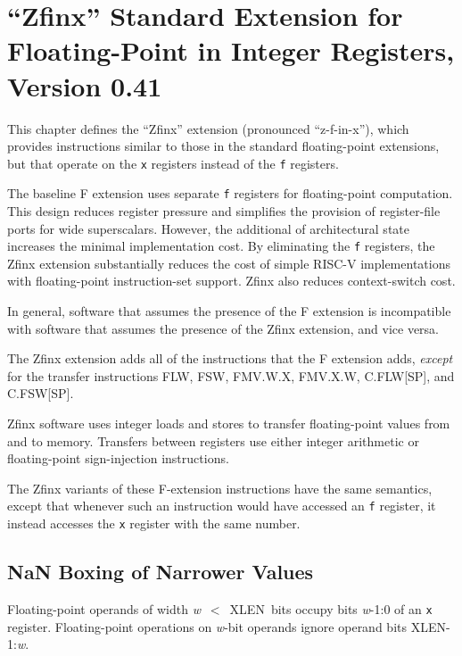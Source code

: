 \chapter{``Zfinx'' Standard Extension for Floating-Point in Integer Registers, Version 0.41}
\label{sec:zfinx}

This chapter defines the ``Zfinx'' extension (pronounced ``z-f-in-x''), which
provides instructions similar to those in the standard floating-point
extensions, but that operate on the {\tt x} registers instead of the {\tt f}
registers.

\begin{commentary}
The baseline F extension uses separate {\tt f} registers for floating-point
computation.
This design reduces register pressure and simplifies the provision of
register-file ports for wide superscalars.
However, the additional  of architectural state increases the
minimal implementation cost.
By eliminating the {\tt f} registers, the Zfinx extension substantially
reduces the cost of simple RISC-V implementations with floating-point
instruction-set support.
Zfinx also reduces context-switch cost.

In general, software that assumes the presence of the F extension
is incompatible with software that assumes the presence of the Zfinx
extension, and vice versa.
\end{commentary}

The Zfinx extension adds all of the instructions that the F extension
adds, {\em except} for the transfer instructions FLW, FSW, FMV.W.X,
FMV.X.W, C.FLW[SP], and C.FSW[SP].

\begin{commentary}
Zfinx software uses integer loads and stores to transfer floating-point values
from and to memory.
Transfers between registers use either integer arithmetic or floating-point
sign-injection instructions.
\end{commentary}

The Zfinx variants of these F-extension instructions have the same semantics,
except that whenever such an instruction would have accessed an {\tt f}
register, it instead accesses the {\tt x} register with the same number.

\section{NaN Boxing of Narrower Values}

Floating-point operands of width \mbox{{\em w} $<$ XLEN bits} occupy bits
\mbox{{\em w}-1:0} of an {\tt x} register.
Floating-point operations on {\em w}-bit operands ignore operand bits
\mbox{XLEN-1:{\em w}}.

